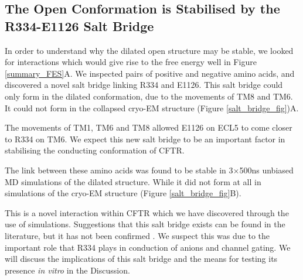 \subsection{The Open Conformation is Stabilised by the R334-E1126 Salt Bridge}
\label{salt_bridge}

In order to understand why the dilated open structure may be stable, we looked for interactions which would give rise to the free energy well in Figure \ref{summary_FES}A. We inspected pairs of positive and negative amino acids, and  discovered a novel salt bridge linking R334 and  E1126. This salt bridge could only form in the dilated conformation, due to the movements of TM8 and TM6. It could not form in the collapsed cryo-EM structure (Figure \ref{salt_bridge_fig})A. 

The movements of TM1, TM6 and TM8 allowed E1126 on ECL5 to come closer to R334 on TM6. We expect this new salt bridge to be an important factor in stabilising the conducting conformation of CFTR.  

The link between these amino acids was found to be stable in 3$\times$500ns unbiased MD simulations of the dilated structure. While it did not form at all in simulations of the cryo-EM structure (Figure \ref{salt_bridge_fig}B).

This is a novel interaction within CFTR which we have discovered through the use of simulations. Suggestions that this salt bridge exists can be found in the literature, but it has not been confirmed \cite{cui2014, wang2016, gong2004, zhang2005}. We suspect this was due to the important role that R334 plays in conduction of anions and channel gating. We will discuss the implications of this salt bridge and the means for testing its presence \textit{in vitro} in the Discussion.

